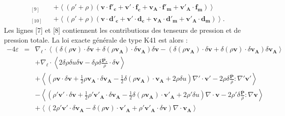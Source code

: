 \begin{equation}
{\begin{array}{lcl}
{}_{[9]}&&+  \left<\left(\rho' + \rho\right)\left(\boldsymbol{v} \cdot \boldsymbol{f'_c} + \boldsymbol{v'} \cdot \boldsymbol{f_c} + \boldsymbol{v_A} \cdot \boldsymbol{f'_m} + \boldsymbol{v'_A} \cdot \boldsymbol{f_m}\right) \right>\\
{}_{[10]}&&+ \left<\left(\rho' + \rho\right)\left(\boldsymbol{v} \cdot \boldsymbol{d'_c} + \boldsymbol{v'} \cdot \boldsymbol{d_c}+\boldsymbol{v_A} \cdot \boldsymbol{d'_m} + \boldsymbol{v'_A} \cdot \boldsymbol{d_m}\right)\right> .
\end{array}}
\end{equation} 
Les lignes [7] et [8] contiennent les contributions des tenseurs de pression et de pression totale. 
La loi exacte générale de type \acs{K41} est alors : 
\begin{equation}
\label{eq:turb_cpg_elk} \boxed{
\begin{array}{lcl}
- 4\varepsilon &=& \nabla_{\boldsymbol{\ell}} \cdot \left<\left(\delta \left(\rho\boldsymbol{v}\right) \cdot \delta \boldsymbol{v}+ \delta \left(\rho\boldsymbol{v_A}\right) \cdot \delta \boldsymbol{v_A} \right) \delta \boldsymbol{v}  -\left(\delta \left(\rho\boldsymbol{v_A}\right) \cdot \delta \boldsymbol{v}  + \delta \left(\rho\boldsymbol{v}\right) \cdot \delta \boldsymbol{v_A}  \right) \delta \boldsymbol{v_A} \right>\\
&&+ \nabla_{\boldsymbol{\ell}} \cdot \left< 2\delta \rho  \delta u \delta \boldsymbol{v}-\delta \rho \delta \frac{ \overline{\boldsymbol{P_*}} }{\rho} \cdot \delta \boldsymbol{v} \right> \\
&& +\left< \left(\rho \boldsymbol{v} \cdot \delta \boldsymbol{v} +\frac{1}{2} \rho \boldsymbol{v_A} \cdot  \delta \boldsymbol{v_A} -\frac{1}{2} \delta \left(\rho \boldsymbol{v_A}\right) \cdot \boldsymbol{v_A} +2\rho \delta u\right) \nabla' \cdot \boldsymbol{v'} -2\rho \delta \frac{ \overline{\boldsymbol{P}} }{\rho}:\nabla' \boldsymbol{v'}\right>\\
 && -\left< \left(\rho' \boldsymbol{v'} \cdot \delta \boldsymbol{v}  + \frac{1}{2} \rho' \boldsymbol{v'_A} \cdot \delta \boldsymbol{v_A}  - \frac{1}{2} \delta \left(\rho \boldsymbol{v_A}\right) \cdot \boldsymbol{v'_A}  +2\rho' \delta u\right)\nabla \cdot \boldsymbol{v} - 2\rho' \delta \frac{ \overline{\boldsymbol{P}} }{\rho} :\nabla  \boldsymbol{v}\right>\\
&&+ \left<\left(2 \rho' \boldsymbol{v'} \cdot \delta \boldsymbol{v_A}- \delta \left(\rho \boldsymbol{v}\right) \cdot \boldsymbol{v'_A} + \rho' \boldsymbol{v'_A} \cdot \delta \boldsymbol{v}  \right)\nabla \cdot \boldsymbol{v_A}\right>\\

\end{array}}
\end{equation}
